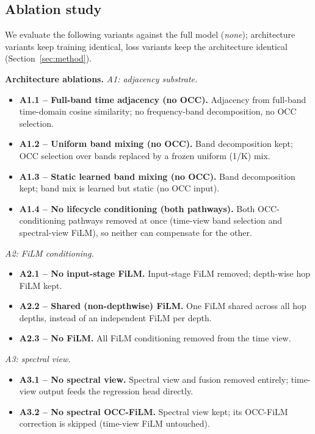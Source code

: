 \subsection{Ablation study}\label{subsec:ablation}

We evaluate the following variants against the full model (\textit{none}); architecture variants keep training identical, loss variants keep the architecture identical (Section~\ref{sec:method}).

\textbf{Architecture ablations.}
\textit{A1: adjacency substrate.}
\begin{itemize}
  \item \textbf{A1.1 -- Full-band time adjacency (no OCC).} Adjacency from full-band time-domain cosine similarity; no frequency-band decomposition, no OCC selection.
  \item \textbf{A1.2 -- Uniform band mixing (no OCC).} Band decomposition kept; OCC selection over bands replaced by a frozen uniform (1/K) mix.
  \item \textbf{A1.3 -- Static learned band mixing (no OCC).} Band decomposition kept; band mix is learned but static (no OCC input).
  \item \textbf{A1.4 -- No lifecycle conditioning (both pathways).} Both OCC-conditioning pathways removed at once (time-view band selection and spectral-view FiLM), so neither can compensate for the other.
\end{itemize}

\textit{A2: FiLM conditioning.}
\begin{itemize}
  \item \textbf{A2.1 -- No input-stage FiLM.} Input-stage FiLM removed; depth-wise hop FiLM kept.
  \item \textbf{A2.2 -- Shared (non-depthwise) FiLM.} One FiLM shared across all hop depths, instead of an independent FiLM per depth.
  \item \textbf{A2.3 -- No FiLM.} All FiLM conditioning removed from the time view.
\end{itemize}

\textit{A3: spectral view.}
\begin{itemize}
  \item \textbf{A3.1 -- No spectral view.} Spectral view and fusion removed entirely; time-view output feeds the regression head directly.
  \item \textbf{A3.2 -- No spectral OCC-FiLM.} Spectral view kept; its OCC-FiLM correction is skipped (time-view FiLM untouched).
\end{itemize}

